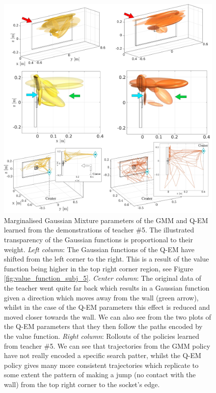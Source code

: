  \begin{figure}
    \centering
    \includegraphics[width=\textwidth]{./ch4-PiH/Figures/Fig/gmm_v2c.pdf}
    \caption{Marginalised Gaussian Mixture parameters of the GMM and Q-EM learned from the demonstrations of teacher \#5. 
    The illustrated transparency of the Gaussian functions is proportional to their weight.
    \textit{Left column}: The Gaussian functions of the Q-EM have shifted from the left corner to the right. This is a result of the value function 
    being higher in the top right corner region, see Figure \ref{fig:value_function_subj_5}. \textit{Center column}:  The original data of the teacher 
    went quite far back which results in a Gaussian function given a direction which moves away from the wall (green arrow), whilst in the case
    of the Q-EM parameters this effect is reduced and moved closer towards the wall.  We can also see from the two plots of the Q-EM parameters 
    that they then follow the paths encoded by the value function.    
    \textit{Right column}: Rollouts of the policies learned from teacher \#5. We can see that trajectories from the GMM policy have not really 
    encoded a specific search patter, whilst the Q-EM policy gives many more consistent trajectories which replicate to some extent 
    the pattern of making a jump (no contact with the wall) from the top right corner to the socket's edge.}
    \label{fig:gmm_exp4}
\end{figure}
 

